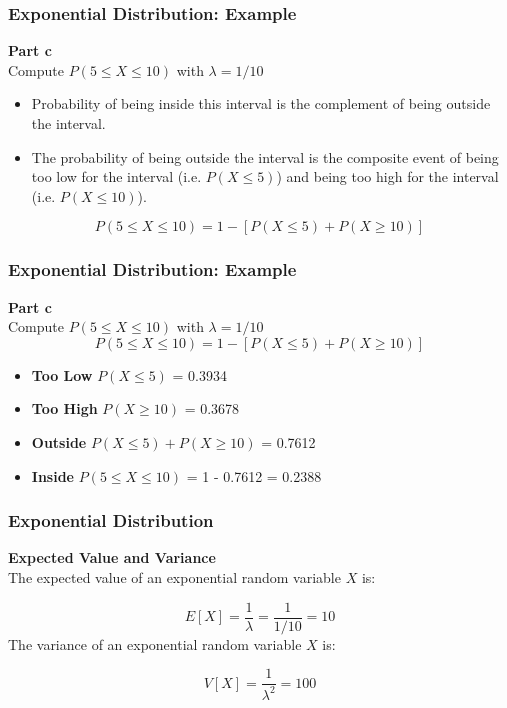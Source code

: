 \documentclass{beamer}
\begin{document}
\begin{frame}[fragile]
\frametitle{Exponential Distribution: Example}
\vspace{-1.0cm}
\Large
\textbf{Part c}\\

Compute $P(5 \leq X \leq 10)$ with $\lambda = 1/10$  \\
\vspace{0.3cm}
\begin{itemize}
\item Probability of being inside this interval is the complement of being outside the interval.
\item The probability of being outside the interval is the composite event of being too low for the interval (i.e. $P( X \leq 5)$)
and being too high for the interval (i.e. $P( X \leq 10)$).
\end{itemize}
\[ P(5 \leq X \leq 10) = 1 - \left[ P( X \leq 5) + P( X \geq 10)  \right] \]
\end{frame}

\begin{frame}[fragile]
\frametitle{Exponential Distribution: Example}
\vspace{-1.0cm}
\Large
\textbf{Part c}\\
Compute $P(5 \leq X \leq 10)$ with $\lambda = 1/10$ 
\vspace{0.1cm}
\[ P(5 \leq X \leq 10) = 1 - \left[ P( X \leq 5) + P( X \geq 10)  \right] \]
\vspace{-0.6cm}
\begin{itemize}
\item \textbf{Too Low} $P(X \leq 5)$ = 0.3934
\vspace{0.2cm}
\item \textbf{Too High} $P(X \geq 10)$ = 0.3678
\vspace{0.2cm}
\item \textbf{Outside} $P( X \leq 5) + P( X \geq 10)$ = 0.7612
\vspace{0.2cm}
\item \textbf{Inside} $P(5 \leq X \leq 10)$ = 1 - 0.7612 = 0.2388
\end{itemize}
\end{frame}

\begin{frame}[fragile]
\frametitle{Exponential Distribution}
\Large
\vspace{-1.0cm}
\textbf{Expected Value and Variance}\\
The expected value of an exponential random variable $X$ is:

\[
E[X] = \frac{1}{\lambda} = \frac{1}{1/10} = 10 \]
The variance of an exponential random variable $X$ is:

\[
V[X] = \frac{1}{\lambda^2} = 100\]

\end{frame}
\end{document}
